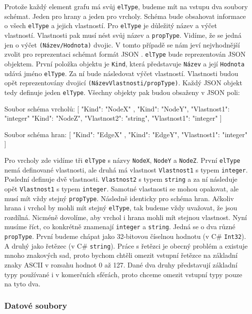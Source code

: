 Protože každý element grafu má svůj \verb+elType+, budeme mít na vstupu dva soubory schémat. 
Jeden pro hrany a jeden pro vrcholy.
Schéma bude obsahovat informace o všech \verb+elType+ a jejich vlastností.
Pro \verb+elType+ je důležitý název a výčet vlastností.
Vlastnosti pak musí nést svůj název a \verb+propType+.
Vidíme, že se jedná jen o výčet \verb+(Název/Hodnota)+ dvojic.
V tomto případě se nám jeví nejvhodnější zvolit pro reprezentaci schémat formát JSON \citep{json}.
\verb+elType+ bude reprezentován JSON objektem. 
První položka objektu je \verb+Kind+, která představuje \texttt{Název} a její \texttt{Hodnota} udává jméno \verb+elType+.
Za ní bude následovat výčet vlastností.
Vlastnosti budou opět reprezentovány dvojicí \verb+(NázevVlastnosti/propType)+.
Každý JSON objekt tedy definuje jeden \texttt{elType}.
Všechny objekty pak budou obsaženy v JSON poli:
\begin{code}
Soubor schéma vrcholů:
[    { "Kind": "NodeX" }, 
     { "Kind": "NodeY", "Vlastnost1": "integer" } 
     { "Kind": "NodeZ", "Vlastnost2": "string", 
       "Vlastnost1": "integer" }  ]
\end{code}
\begin{code}
Soubor schéma hran:
[    { "Kind": "EdgeX" }, 
     { "Kind": "EdgeY", "Vlastnost1": "integer" } ]
\end{code}
Pro vrcholy zde vidíme tři \texttt{elType} s názvy \texttt{NodeX}, \texttt{NodeY} a \texttt{NodeZ}.
První \texttt{elType} nemá definované vlastnosti, ale druhá má vlastnost \texttt{Vlastnost1} s typem \texttt{integer}.
Poslední definuje dvě vlastnosti.
\texttt{Vlastnost2} s typem \texttt{string} a za ní následuje opět \texttt{Vlastnost1} s typem \texttt{integer}.
Samotné vlastnosti se mohou opakovat, ale musí mít vždy stejný \texttt{propType}.
Následně identicky pro schéma hran.
Ačkoliv hrana i vrchol by mohli mít stejný \texttt{elType}, tak budeme vždy uvažovat, že jsou rozdílná.
Nicméně dovolíme, aby vrchol i hrana mohli mít stejnou vlastnost.
Nyní musíme říct, co konkrétně znamenají \texttt{integer} a \texttt{string}.
Jedná se o dva různé \texttt{propType}.
První budeme chápat jako 32-bitovou číselnou hodnotu (v C\# \texttt{Int32}).
A druhý jako řetězec (v C\# \texttt{string}).
Práce s řetězci je obecný problém a existuje mnoho znakových sad, proto bychom chtěli omezit vstupní řetězce na základní znaky ASCII v rozsahu hodnot 0 až 127.  
Dané dva druhy představují základní typy používané i v komerčních sférách, proto chceme omezit vstupní typy pouze na tyto dva.

\subsubsection{Datové soubory}


